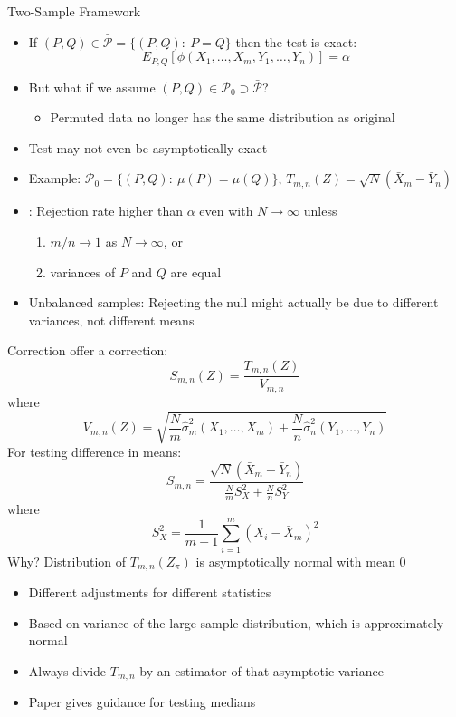 \begin{frame}{Two-Sample Framework}
\begin{itemize}
    \item If $(P,Q)\in \bar{\mathcal{P}}=\{(P,Q):\ P=Q\}$ then the test is exact:
    $$
        E_{P,Q}[\phi(X_1,\ldots,X_m,Y_1,\ldots,Y_n)] = \alpha
    $$
    \item But what if we assume $(P,Q)\in \mathcal{P}_0 \supset \bar{\mathcal{P}}$?
    \begin{itemize}
        \item Permuted data no longer has the same distribution as original
    \end{itemize}
    \item Test may not even be asymptotically exact
    \item Example: $\mathcal{P}_0 = \{(P,Q):\ \mu(P)=\mu(Q)\}$, $T_{m,n}(Z)=\sqrt{N}(\bar{X}_m-\bar{Y}_n)$
    \item \citet{Romano1990}: Rejection rate higher than $\alpha$ even with $N\rightarrow\infty$ unless
    \begin{enumerate}
        \item $m/n\rightarrow 1$ as $N\rightarrow\infty$, or
        \item variances of $P$ and $Q$ are equal
    \end{enumerate}
    \item Unbalanced samples: Rejecting the null might actually be due to different variances, not different means
\end{itemize}
\end{frame}

\begin{frame}{\citet{ChungRomano2013} Correction}
\citet{ChungRomano2013} offer a correction:
$$
    S_{m,n}(Z) = \frac{T_{m,n}(Z)}{V_{m,n}}
$$
where
$$
    V_{m,n}(Z) = \sqrt{\frac{N}{m}\hat{\sigma}_m^2(X_1,\ldots,X_m)+\frac{N}{n}\hat{\sigma}_n^2(Y_1,\ldots,Y_n)}
$$
For testing difference in means:
$$
    S_{m,n} = \frac{\sqrt{N}(\bar{X}_m-\bar{Y}_n)}{\frac{N}{m}S_X^2 + \frac{N}{n}S_Y^2}
$$
where
$$
    S_X^2 = \frac{1}{m-1}\sum_{i=1}^m (X_i-\bar{X}_m)^2
$$
Why? Distribution of $T_{m,n}(Z_\pi)$ is asymptotically normal with mean 0
\end{frame}

\begin{frame}{\citet{ChungRomano2013}}
\citet{ChungRomano2013}
    \begin{itemize}
        \item Different adjustments for different statistics
        \item Based on variance of the large-sample distribution, which is approximately normal
        \item Always divide $T_{m,n}$ by an estimator of that asymptotic variance
        \item Paper gives guidance for testing medians
    \end{itemize}
\end{frame}

